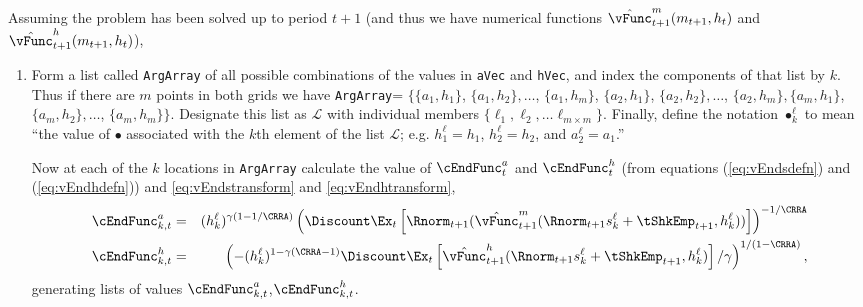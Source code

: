 \documentclass[titlepage]{\econtex}
\begin{document}
{  Assuming the problem has been solved up to period $t+1$ (and thus we
  have numerical functions $\hat{\vFunc}_{t+1}^{m}({m}_{t+1},h_{t})$ and
  $\hat{\vFunc}_{t+1}^{h}({m}_{t+1},h_{t})$),
  \begin{enumerate}

  \item Form a list called \texttt{ArgArray} of all possible
    combinations of the values in \texttt{aVec} and
    \texttt{hVec}, and index the components of that list by $k$.  Thus
    if there are $m$ points in both grids we have \texttt{ArgArray}=
    $\{\{{a}_{1},h_{1}\}$, $\{{a}_{1},h_{2}\},\ldots$,
    $\{{a}_{1},h_{m}\}$, $\{{a}_{2},h_{1}\}$,
    $\{{a}_{2},h_{2}\},\ldots$, $\{{a}_{2},h_{m}\},
    \{{a}_{m},h_{1}\}$, $\{{a}_{m},h_{2}\},\ldots$,
    $\{{a}_{m},h_{m}\}\}$.  Designate this list as $\mathcal{L}$
    with individual members $\{\ell_{1}, \ell_{2}, \ldots \ell_{m \times
      m}\}$.  Finally, define the notation $\bullet^{\ell}_{k}$ to mean
    ``the value of $\bullet$ associated with the $k$th element of the
    list $\mathcal{L}$; e.g. $h^{\ell}_{1} = h_{1}$, $h^{\ell}_{2} =
    h_{2}$, and ${a}^{\ell}_{2}={a}_{1}$.''

    Now at each of the $k$ locations in \texttt{ArgArray} calculate the
    value of $\cEndFunc_{t}^{{a}}$ and $\cEndFunc_{t}^{h}$ (from
    equations (\ref{eq:vEndsdefn}) and (\ref{eq:vEndhdefn})) and
    \eqref{eq:vEndstransform} and \eqref{eq:vEndhtransform},
    \begin{eqnarray}
      \cEndFunc_{k,t}^{{a}} & = & (h_{k}^{\ell})^{\gamma(1-1/\CRRA)}
                                  \left(\Discount \Ex_{t}
                                  \left[
                                  \Rnorm_{t+1} (\hat{\vFunc}_{t+1}^{m}(\Rnorm_{t+1} s^{\ell}_{k} +
                                  {\tShkEmp}_{t+1},h^{\ell}_{k}))
                                  \right]
                                  \right)^{-1/\CRRA}
      \\      \cEndFunc_{k,t}^{h} & = &
                                        \left(-(h_{k}^{\ell})^{1-\gamma(\CRRA-1)} \Discount \Ex_{t}
                                        \left[
                                        \hat{\vFunc}_{t+1}^{h}(\Rnorm_{t+1} s^{\ell}_{k} +
                                        {\tShkEmp}_{t+1},h^{\ell}_{k})
                                        \right]/\gamma
                                        \right)^{1/(1-\CRRA)},
    \end{eqnarray}
    generating lists of values
    $\cEndFunc^{a}_{k,t}$,$\cEndFunc^{h}_{k,t}$.


\end{enumerate}}
\end{document}
